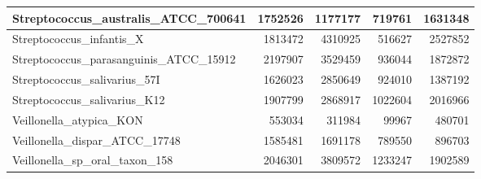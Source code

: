 \documentclass[12pt,a4paper]{article}
\begin{document}
\begin{table}[ht]
\begin{center}
\begin{tabular}{|l*{4}{|r}|}
Streptococcus\_australis\_ATCC\_700641 & 1752526 & 1177177 & 719761 & 1631348 \\ \hline
Streptococcus\_infantis\_X & 1813472 & 4310925 & 516627 & 2527852 \\ \hline
Streptococcus\_parasanguinis\_ATCC\_15912 & 2197907 & 3529459 & 936044 & 1872872 \\ \hline
Streptococcus\_salivarius\_57I & 1626023 & 2850649 & 924010 & 1387192 \\ \hline
Streptococcus\_salivarius\_K12 & 1907799 & 2868917 & 1022604 & 2016966 \\ \hline
Veillonella\_atypica\_KON & 553034 & 311984 & 99967 & 480701 \\ \hline
Veillonella\_dispar\_ATCC\_17748 & 1585481 & 1691178 & 789550 & 896703 \\ \hline
Veillonella\_sp\_oral\_taxon\_158 & 2046301 & 3809572 & 1233247 & 1902589 \\ \hline
\end{tabular}
\end{center}
\end{table}
\end{document}
